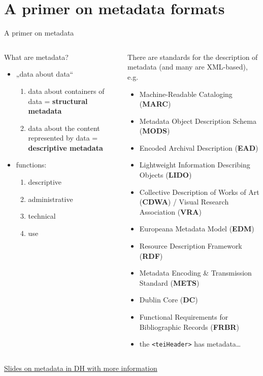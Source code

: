 \section{A primer on metadata formats}

\begin{frame}{A primer on metadata}
\small
\begin{columns}
\begin{block}{What are metadata?}
\begin{itemize}
\item „data about data“
\begin{enumerate}\footnotesize
\item data about containers of data = \textbf{structural metadata}
\item data about the content represented by data = \textbf{descriptive metadata}
\end{enumerate}
\item functions:
\begin{enumerate}\footnotesize
\item descriptive
\item administrative
\item technical
\item use
\end{enumerate}
\end{itemize}
\end{block}

\begin{block}{}
There are standards for the description of metadata (and many are XML-based), e.g.
\begin{itemize}\scriptsize
\item Machine-Readable Cataloging (\textbf{MARC})
\item Metadata Object Description Schema (\textbf{MODS})
\item Encoded Archival Description (\textbf{EAD})
\item Lightweight Information Describing Objects (\textbf{LIDO})
\item Collective Description of Works of Art (\textbf{CDWA}) / Visual Research Association (\textbf{VRA})
\item Europeana Metadata Model (\textbf{EDM})
\item Resource Description Framework (\textbf{RDF})
\item Metadata Encoding \& Transmission Standard (\textbf{METS})
\item Dublin Core (\textbf{DC})
\item Functional Requirements for Bibliographic Records (\textbf{FRBR})
\item the \texttt{<teiHeader>} has metadata\dots
\end{itemize}
\end{block}


\end{columns}
{\scriptsize \href{http://dixit.uni-koeln.de/wp-content/uploads/2015/04/Camp2-18-Georg_Vogeler_-_Metadata__talk.pdf}{Slides on metadata in DH with more information}}
\end{frame}

